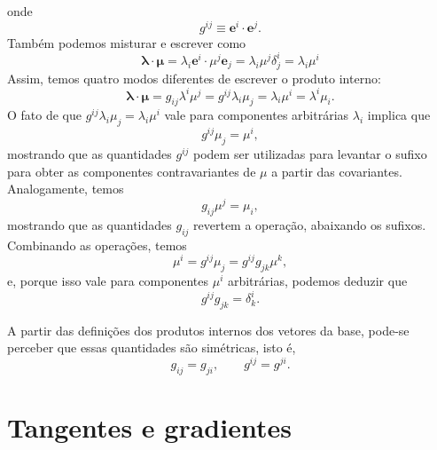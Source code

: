 onde
\begin{equation}\label{eq:DefinicaoTensorMetricaCovariante}
	\boxed{
		g^{i j} \equiv \mathbf{e}^{i} \cdot \mathbf{e}^{j}  .
	}
\end{equation}
Também podemos misturar e escrever como
\[
	\boldsymbol{\lambda} \cdot \boldsymbol{\mu}=\lambda_{i} \mathbf{e}^{i} \cdot \mu^{j} \mathbf{e}_{j}=\lambda_{i} \mu^{j} \delta_{j}^{i}=\lambda_{i} \mu^{i}
\]
Assim, temos quatro modos diferentes de escrever o produto interno:
\begin{equation}\label{eq:ProdutoInterno}
	\boxed{
		\boldsymbol{\lambda} \cdot \boldsymbol{\mu}=g_{ij}\lambda^i\mu^j = g^{ij}\lambda_i\mu_j = \lambda_i\mu^i = \lambda^i\mu_i .
	}
\end{equation}
O fato de que $g^{ij}\lambda_i\mu_j=\lambda_i\mu^i$ vale para componentes arbitrárias $\lambda_i$ implica que 
\begin{equation}\label{eq:LevantamentoIndice}
	g^{ij}\mu_j=\mu^i ,
\end{equation}
mostrando que as quantidades $g^{ij}$ podem ser utilizadas para levantar o sufixo para obter as componentes contravariantes de $\mu$ a partir das covariantes. Analogamente, temos 
\begin{equation}\label{eq:AbaixamentoIndice}
	g_{ij}\mu^j=\mu_i ,
\end{equation}
mostrando que as quantidades $g_{ij}$ revertem a operação, abaixando os sufixos. Combinando as operações, temos
\[
	\mu^i = g^{ij}\mu_j=g^{ij}g_{jk}\mu^k ,
\]
e, porque isso vale para componentes $\mu^i$ arbitrárias, podemos deduzir que
\begin{equation}
	\boxed{
		g^{ij}g_{jk}=\delta^i_k   .
	}
\end{equation}

A partir das definições dos produtos internos dos vetores da base, pode-se perceber que essas quantidades são simétricas, isto é,
\begin{equation}\label{eq:SimetriaTensorMetrica}
	g_{ij}=g_{ji}, \qquad g^{ij}=g^{ji} .
\end{equation}

\section{Tangentes e gradientes}\label{sec:TangentesGradientes}

